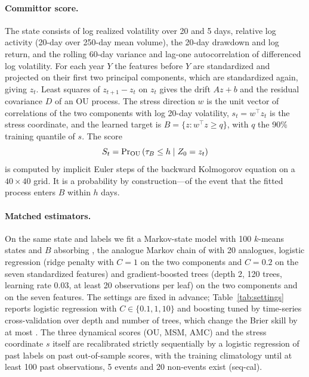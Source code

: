 \documentclass[preprint,12pt,authoryear]{elsarticle}
\newcommand{\Sraw}{S}
\begin{document}
\paragraph{Committor score.} The state consists of log realized volatility over 20 and 5 days, relative log activity (20-day over 250-day mean volume), the 20-day drawdown and log return, and the rolling 60-day variance and lag-one autocorrelation of differenced log volatility. For each year $Y$ the features before $Y$ are standardized and projected on their first two principal components, which are standardized again, giving $z_t$. Least squares of $z_{t+1}-z_t$ on $z_t$ gives the drift $Az+b$ and the residual covariance $D$ of an OU process. The stress direction $w$ is the unit vector of correlations of the two components with log 20-day volatility, $s_t=w^\top z_t$ is the stress coordinate, and the learned target is $B=\{z: w^\top z\ge q\}$, with $q$ the 90\% training quantile of $s$. The score
\begin{equation}
\Sraw_t=\Pr\nolimits_{\rm OU}\left(\tau_B\le h \mid Z_0=z_t\right)
\end{equation}
is computed by implicit Euler steps of the backward Kolmogorov equation on a $40\times40$ grid. It is a probability by construction---of the event that the fitted process enters $B$ within $h$ days.

\paragraph{Matched estimators.} On the same state and labels we fit a Markov-state model with 100 $k$-means states and $B$ absorbing \citep{prinz2011}, the analogue Markov chain of \citet{lucente2022} with 20 analogues, logistic regression (ridge penalty with $C=1$ on the two components and $C=0.2$ on the seven standardized features) and gradient-boosted trees \citep{friedman2001} (depth 2, 120 trees, learning rate 0.03, at least 20 observations per leaf) on the two components and on the seven features. The settings are fixed in advance; Table~\ref{tab:settings} reports logistic regression with $C\in\{0.1,1,10\}$ and boosting tuned by time-series cross-validation over depth and number of trees, which change the Brier skill by at most \SetMaxChange. The three dynamical scores (OU, MSM, AMC) and the stress coordinate $s$ itself are recalibrated strictly sequentially by a logistic regression of past labels on past out-of-sample scores, with the training climatology until at least 100 past observations, 5 events and 20 non-events exist (seq-cal).
\end{document}
